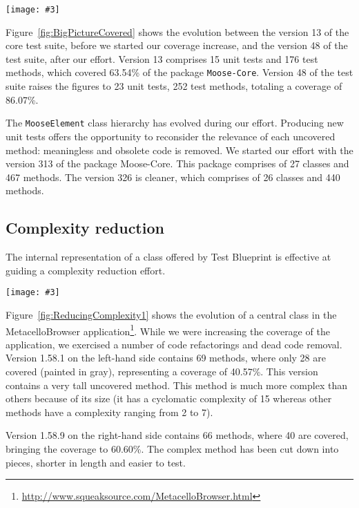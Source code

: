 \documentclass{sig-alternate}
\newcommand{\ct}{\lstinline[backgroundcolor=\color{white},basicstyle=\footnotesize\ttfamily]}
\newcommand{\largefig}[4]{
	\begin{figure*}[#1]
		\centering
		\texttt{[image: \#3]}
		\caption{\label{fig:#3}#4}
	\end{figure*}}
\newcommand{\seclabel}[1]{\label{sec:#1}}
\newcommand{\figref}[1]{Figure~\ref{fig:#1}}
\begin{document}
\largefig{}{1}{BigPictureCovered}{Evolution of the \ct{MooseElement} class hierarchy.}

\figref{BigPictureCovered} shows the evolution between the version 13 of the core test suite, before we started our coverage increase, and the version 48 of the test suite, after our effort. Version 13 comprises 15 unit tests and 176 test methods, which covered 63.54\% of the package \ct{Moose-Core}.  Version 48 of the test suite raises the figures to 23 unit tests, 252 test methods, totaling a coverage of 86.07\%.

The \ct{MooseElement} class hierarchy has evolved during our effort. Producing new unit tests offers the opportunity to reconsider the relevance of each uncovered method: meaningless and obsolete code is removed. We started our effort with the version 313 of the package Moose-Core. This package comprises of 27 classes and 467 methods. The version 326 is cleaner, which comprises of 26 classes and 440 methods.

\subsection{Complexity reduction}\seclabel{complexityReduction}

The internal representation of a class offered by Test Blueprint is effective at guiding a complexity reduction effort.

\largefig{}{0.5}{ReducingComplexity1}{Complexity reduction in MetacelloBrowser.}

\figref{ReducingComplexity1} shows the evolution of a central class in the MetacelloBrowser application\footnote{\url{http://www.squeaksource.com/MetacelloBrowser.html}}. While we were increasing the coverage of the application, we exercised a number of code refactorings and dead code removal. Version 1.58.1 on the left-hand side contains 69 methods, where only 28 are covered (painted in gray), representing a coverage of 40.57\%.  This version contains a very tall uncovered method. This method is much more complex than others because of its size (it has a cyclomatic complexity of 15 whereas other methods have a complexity ranging from 2 to 7). 

Version 1.58.9 on the right-hand side contains 66 methods, where 40 are covered, bringing the coverage to 60.60\%. The complex method has been cut down into pieces, shorter in length and easier to test. 

\end{document}
